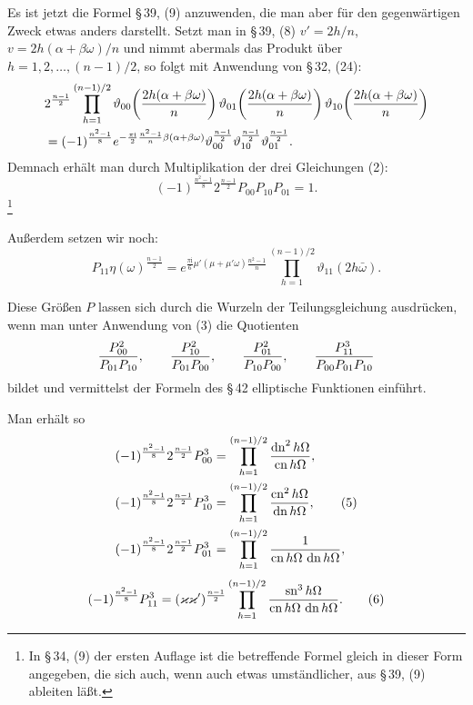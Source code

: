 \documentclass[11pt]{article}
\providecommand{\sn}{\operatorname{sn}}
\providecommand{\cn}{\operatorname{cn}}
\providecommand{\dn}{\operatorname{dn}}
\providecommand{\ii}{\mathrm{i}}
\begin{document}
Es ist jetzt die Formel \S\,39, (9) anzuwenden, die man aber für den gegenwärtigen Zweck
etwas anders darstellt. Setzt man in \S\,39, (8) $v'=2h/n$, $v=2h(\alpha+\beta\omega)/n$
und nimmt abermals das Produkt über $h=1,2,\ldots,(n-1)/2$, so folgt mit Anwendung
von \S\,32, (24):
\begin{align*}
&2^{\frac{n-1}{2}}
 \prod_{h=1}^{(n-1)/2}
 \vartheta_{00}\!\left({2h(\alpha+\beta\omega)\over n}\right)
 \vartheta_{01}\!\left({2h(\alpha+\beta\omega)\over n}\right)
 \vartheta_{10}\!\left({2h(\alpha+\beta\omega)\over n}\right)\\
&
=(-1)^{\frac{n^2-1}{8}}
 e^{-\frac{\pi\ii}{2}\frac{n^2-1}{n}\beta(\alpha+\beta\omega)}
 \vartheta_{00}^{\frac{n-1}{2}}
 \vartheta_{10}^{\frac{n-1}{2}}
 \vartheta_{01}^{\frac{n-1}{2}}.
\end{align*}
Demnach erhält man durch Multiplikation der drei Gleichungen (2):
\begin{equation}
 (-1)^{\frac{n^2-1}{8}}2^{\frac{n-1}{2}}P_{00}P_{10}P_{01}=1.
\tag{3}
\end{equation}\footnote{In \S\,34, (9) der ersten Auflage ist die betreffende Formel gleich in dieser Form angegeben, die sich auch, wenn auch etwas umständlicher, aus \S\,39, (9) ableiten läßt.}

Außerdem setzen wir noch:
\begin{equation}
 P_{11}\eta(\omega)^{\frac{n-1}{2}}
 =e^{\frac{\pi\ii}{6}\mu'(\mu+\mu'\omega)\frac{n^2-1}{n}}
 \prod_{h=1}^{(n-1)/2}\vartheta_{11}(2h\bar\omega).
\tag{4}
\end{equation}

Diese Größen $P$ lassen sich durch die Wurzeln der Teilungsgleichung ausdrücken, wenn
man unter Anwendung von (3) die Quotienten
\[
 {P_{00}^2\over P_{01}P_{10}},\qquad
 {P_{10}^2\over P_{01}P_{00}},\qquad
 {P_{01}^2\over P_{10}P_{00}},\qquad
 {P_{11}^3\over P_{00}P_{01}P_{10}}
\]
bildet und vermittelst der Formeln des \S\,42 elliptische Funktionen einführt.

Man erhält so
\begin{align}
 (-1)^{\frac{n^2-1}{8}}2^{\frac{n-1}{2}}P_{00}^3
 &=\prod_{h=1}^{(n-1)/2}{\dn^2 h\Omega\over \cn h\Omega},\notag\\
 (-1)^{\frac{n^2-1}{8}}2^{\frac{n-1}{2}}P_{10}^3
 &=\prod_{h=1}^{(n-1)/2}{\cn^2 h\Omega\over \dn h\Omega},
\tag{5}\\
 (-1)^{\frac{n^2-1}{8}}2^{\frac{n-1}{2}}P_{01}^3
 &=\prod_{h=1}^{(n-1)/2}{1\over \cn h\Omega\,\dn h\Omega},\notag
\end{align}
\begin{equation}
 (-1)^{\frac{n^2-1}{8}}P_{11}^3
 =(\varkappa\varkappa')^{\frac{n-1}{2}}
 \prod_{h=1}^{(n-1)/2}{\sn^3h\Omega\over \cn h\Omega\,\dn h\Omega}.
\tag{6}
\end{equation}
\end{document}
